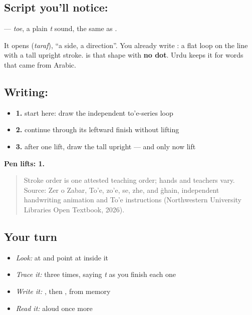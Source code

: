 \subsection*{Script you'll notice: }
\textbf{} — \emph{toe}, a plain \emph{t} sound, the same as \textbf{}.

It opens \textbf{} (\emph{taraf}), \textquotedblleft{}a side, a direction\textquotedblright{}. You already write \textbf{}: a flat loop on the line with a tall upright stroke. \textbf{} is that shape with \textbf{no dot}. Urdu keeps it for words that came from Arabic.

\subsection*{Writing: }

\begin{itemize}
\raggedright
  \item \textbf{1.} start here: draw the independent to'e-series loop
  \item \textbf{2.} continue through its leftward finish without lifting
  \item \textbf{3.} after one lift, draw the tall upright — and only now lift
\end{itemize}

\textbf{Pen lifts: 1.}

\begin{quote}
Stroke order is one attested teaching order; hands and teachers vary. Source: Zer o Zabar, To’e, zo’e, se, zhe, and ġhain, independent  handwriting animation and To’e instructions (Northwestern University Libraries Open Textbook, 2026).
\end{quote}

\subsection*{Your turn}
\begin{itemize}
\raggedright
  \item \emph{Look:} at \textbf{} and point at  inside it
  \item \emph{Trace it:}  three times, saying \emph{t} as you finish each one
  \item \emph{Write it:} , then , from memory
  \item \emph{Read it:} \textbf{} aloud once more
\end{itemize}

